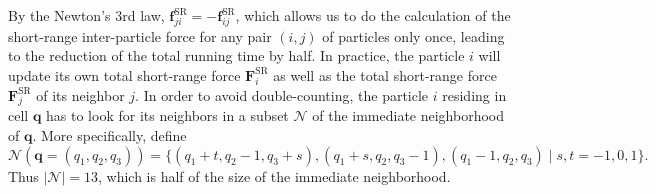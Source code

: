 By the Newton's 3rd law, $\mathbf{f}^\text{SR}_{ji} = -\mathbf{f}^\text{SR}_{ij}$, which allows us to do the calculation of the short-range inter-particle force for any pair $(i, j)$ of particles only once, leading to the reduction of the total running time by half.
In practice, the particle $i$ will update its own total short-range force $\mathbf{F}^\text{SR}_i$ as well as the total short-range force $\mathbf{F}^\text{SR}_j$ of its neighbor $j$.
In order to avoid double-counting, the particle $i$ residing in cell $\mathbf{q}$ has to look for its neighbors in a subset $\mathcal{N}$ of the immediate neighborhood of $\mathbf{q}$.
More specifically, define
\begin{equation*}
    \mathcal{N}(\mathbf{q} = (q_1, q_2, q_3)) = \{(q_1+t, q_2-1,q_3+s), (q_1+s, q_2, q_3-1), (q_1-1,q_2,q_3) \;|\; s,t = -1,0,1 \}.
\end{equation*}
Thus $|\mathcal{N}| = 13$, which is half of the size of the immediate neighborhood.

